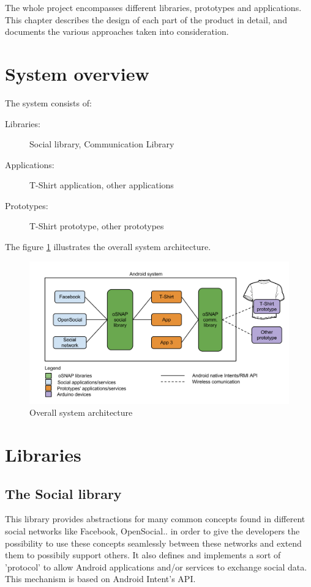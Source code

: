 

The whole project encompasses different libraries, prototypes and applications.
This chapter describes the design of each part of the product in detail,
and documents the various approaches taken into consideration.

\section{System overview}

The system consists of:
\begin{description}
	\item[Libraries:] Social library, Communication Library
	\item[Applications:] T-Shirt application, other applications
	\item[Prototypes:] T-Shirt prototype, other prototypes
\end{description}

The figure \ref{fig:design-toplevel} illustrates the overall system architecture.

\begin{figure}[h!]
\centering \includegraphics[scale=0.35]{img/design-toplevel.png}
\caption{Overall system architecture}
\label{fig:design-toplevel}
\end{figure}


\section{Libraries}

\subsection{The Social library}
This library provides abstractions for many common concepts found in different
social networks like Facebook, OpenSocial.. in order to give the developers the possibility
to use these concepts seamlessly between these networks and extend them to possibily support others.
It also defines and implements a sort of 'protocol' to allow Android applications and/or services
to exchange social data. This mechanism is based on Android Intent's API.

